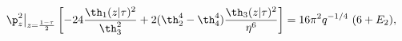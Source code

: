 \begin{equation}
 \p_z^2\big|_{z={1-\tau\over 2}}\left[ -24 {\th_1(z|\tau)^2
 \over \th_3^2} + 2(\th_2^4-\th_4^4) {\th_3(z|\tau)^2
 \over\eta^6} \right] 
=  16 \pi^2 q^{-1/4} ~(6+E_2),
\end{equation}

